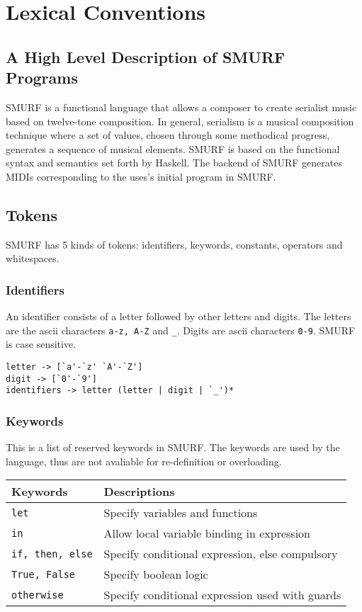 \section{Lexical Conventions}
\subsection{A High Level Description of SMURF Programs}
SMURF is a functional language that allows a composer to create serialist music
based on twelve-tone composition. In general, serialism is a musical composition
technique where a set of values, chosen through some methodical progress,
generates a sequence of musical elements. SMURF is based on the
functional syntax and semantics set forth by Haskell. The backend of
SMURF generates MIDIs corresponding to the uses's initial program in
SMURF. 

\subsection{Tokens}
SMURF has 5 kinds of tokens: identifiers, keywords, constants, operators and whitespaces.

\subsubsection{Identifiers}
\label{sec:identifiers}
An identifier consists of a letter followed by other letters and
digits. The letters are the ascii characters \texttt{a-z, A-Z} and \texttt{\_}. Digits are ascii
characters \texttt{0-9}. SMURF is case sensitive.
\begin{verbatim}
letter -> [`a'-`z' `A'-`Z']
digit -> [`0'-`9']
identifiers -> letter (letter | digit | `_')*
\end{verbatim}

\subsubsection{Keywords}
This is a list of reserved keywords in SMURF. The keywords are used by the
language, thus are not avaliable for re-definition or overloading.
\begin{table} [H]
	\centering
    \begin{tabularx}{0.9\textwidth}{l@{\hskip 3cm}l}
    \hline\hline
    Keywords & Descriptions \\ 
    \hline\hline
      \texttt{let} & Specify variables and functions  \\ \hline
      \texttt{in} & Allow local variable binding in expression \\ \hline
      \texttt{if, then, else} & Specify conditional expression, else compulsory  \\ \hline
      \texttt{True, False} & Specify boolean logic \\ \hline
      \texttt{otherwise} & Specify conditional expression used with guards \\ \hline 
    \end{tabularx}
\end{table}


